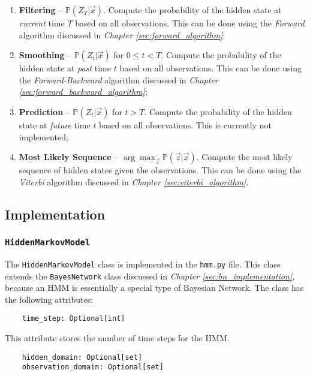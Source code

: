 \documentclass{article}
\theoremstyle{definition}
\renewcommand{\P}{\mathbb{P}}
\begin{document}
\begin{enumerate}
    \item \textbf{Filtering} -- \(\P(Z_T | \vec x)\). Compute the probability of the hidden state at \textit{current} time \(T\) based on all observations. This can be done using the \textit{Forward} algorithm discussed in \textit{Chapter \ref{sec:forward_algorithm}};
    \item \textbf{Smoothing} -- \(\P(Z_t | \vec x)\) for \(0 \leq t < T\). Compute the probability of the hidden state at \textit{past} time \(t\) based on all observations. This can be done using the \textit{Forward-Backward} algorithm discussed in \textit{Chapter \ref{sec:forward_backward_algorithm}};
    \item \textbf{Prediction} -- \(\P(Z_t | \vec x)\) for \(t > T\). Compute the probability of the hidden state at \textit{future} time \(t\) based on all observations. This is currently not implemented;
    \item \textbf{Most Likely Sequence} -- \(\arg \max_{\vec z} \P(\vec z | \vec x)\). Compute the most likely sequence of hidden states given the observations. This can be done using the \textit{Viterbi} algorithm discussed in \textit{Chapter \ref{sec:viterbi_algorithm}}.
\end{enumerate}

\subsection{Implementation}

\subsubsection{\texttt{HiddenMarkovModel}}

The \texttt{HiddenMarkovModel} class is implemented in the \texttt{hmm.py} file. This class extends the \texttt{BayesNetwork} class discussed in \textit{Chapter \ref{sec:bn_implementation}}, because an HMM is essentially a special type of Bayesian Network. The class has the following attributes:

\begin{verbatim}
    time_step: Optional[int]
\end{verbatim}

This attribute stores the number of time steps for the HMM.

\begin{verbatim}
    hidden_domain: Optional[set]
    observation_domain: Optional[set]
\end{verbatim}
\end{document}
